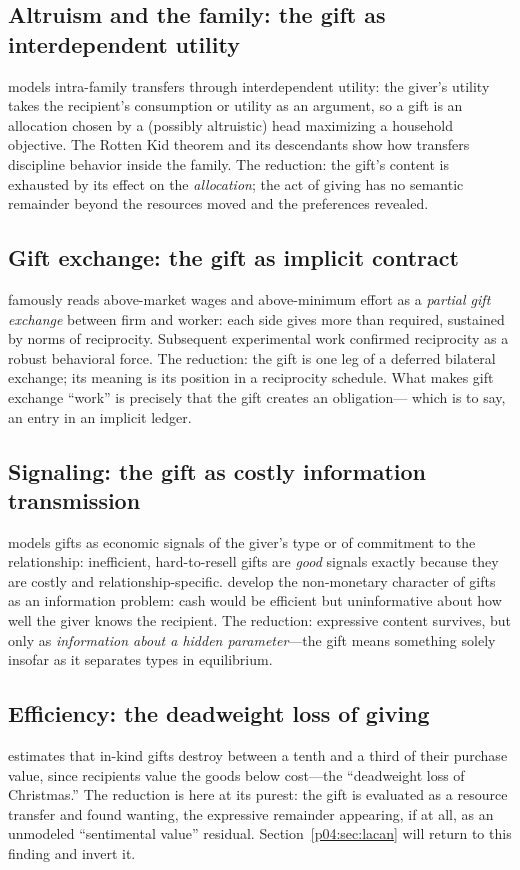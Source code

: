 \documentclass[11pt,a4paper]{article}
\begin{document}
\subsection{Altruism and the family: the gift as interdependent utility}
\textcite{becker1981} models intra-family transfers through interdependent
utility: the giver's utility takes the recipient's consumption or utility as
an argument, so a gift is an allocation chosen by a (possibly altruistic)
head maximizing a household objective. The Rotten Kid theorem and its
descendants show how transfers discipline behavior inside the family. The
reduction: the gift's content is exhausted by its effect on the
\emph{allocation}; the act of giving has no semantic remainder beyond the
resources moved and the preferences revealed.

\subsection{Gift exchange: the gift as implicit contract}
\textcite{akerlof1982} famously reads above-market wages and above-minimum
effort as a \emph{partial gift exchange} between firm and worker: each side
gives more than required, sustained by norms of reciprocity. Subsequent
experimental work \parencite{fehr1993} confirmed reciprocity as a robust
behavioral force. The reduction: the gift is one leg of a deferred bilateral
exchange; its meaning is its position in a reciprocity schedule. What makes
gift exchange ``work'' is precisely that the gift creates an obligation---
which is to say, an entry in an implicit ledger.

\subsection{Signaling: the gift as costly information transmission}
\textcite{camerer1988} models gifts as economic signals of the giver's type or
of commitment to the relationship: inefficient, hard-to-resell gifts are
\emph{good} signals exactly because they are costly and relationship-specific.
\textcite{prendergast2001} develop the non-monetary character of gifts as an
information problem: cash would be efficient but uninformative about how well
the giver knows the recipient. The reduction: expressive content survives,
but only as \emph{information about a hidden parameter}---the gift means
something solely insofar as it separates types in equilibrium.

\subsection{Efficiency: the deadweight loss of giving}
\textcite{waldfogel1993} estimates that in-kind gifts destroy between a tenth
and a third of their purchase value, since recipients value the goods below
cost---the ``deadweight loss of Christmas.'' The reduction is here at its
purest: the gift is evaluated as a resource transfer and found wanting, the
expressive remainder appearing, if at all, as an unmodeled ``sentimental
value'' residual. Section~\ref{p04:sec:lacan} will return to this finding and
invert it.
\end{document}
